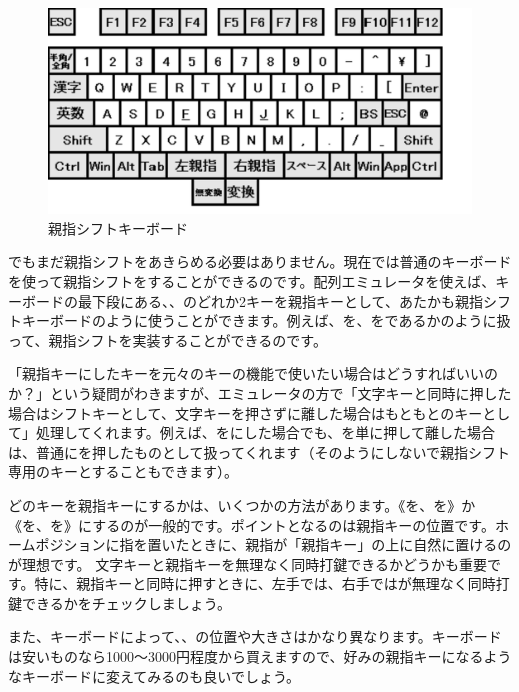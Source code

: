 \begin{figure}
 \begin{center}
   \includegraphics[width=14cm,clip]{res_kouy/oyayubi-shift_keyboard.eps}
 \end{center}
 \caption{親指シフトキーボード}
 \label{oyayubi-shift_keyboard}
\end{figure}

でもまだ親指シフトをあきらめる必要はありません。現在では普通のキーボードを使って親指シフトをすることができるのです。配列エミュレータを使えば、キーボードの最下段にある、、のどれか2キーを親指キーとして、あたかも親指シフトキーボードのように使うことができます。例えば、を、をであるかのように扱って、親指シフトを実装することができるのです。

「親指キーにしたキーを元々のキーの機能で使いたい場合はどうすればいいのか？」という疑問がわきますが、エミュレータの方で「文字キーと同時に押した場合はシフトキーとして、文字キーを押さずに離した場合はもともとのキーとして」処理してくれます。例えば、をにした場合でも、を単に押して離した場合は、普通にを押したものとして扱ってくれます（そのようにしないで親指シフト専用のキーとすることもできます）。

どのキーを親指キーにするかは、いくつかの方法があります。《を、を》か《を、を》にするのが一般的です。ポイントとなるのは親指キーの位置です。ホームポジションに指を置いたときに、親指が「親指キー」の上に自然に置けるのが理想です。
文字キーと親指キーを無理なく同時打鍵できるかどうかも重要です。特に、親指キーと同時に押すときに、左手では、右手では\key{,}\key{/}が無理なく同時打鍵できるかをチェックしましょう。

また、キーボードによって、、の位置や大きさはかなり異なります。キーボードは安いものなら1000～3000円程度から買えますので、好みの親指キーになるようなキーボードに変えてみるのも良いでしょう。

